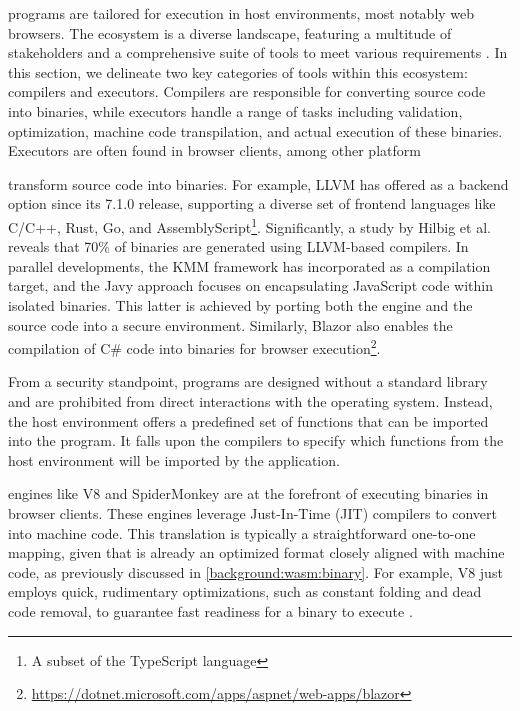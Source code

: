\Wasm programs are tailored for execution in host environments, most notably web browsers. 
The \Wasm ecosystem is a diverse landscape, featuring a multitude of stakeholders and a comprehensive suite of tools to meet various requirements \cite{Avenger}. 
In this section, we delineate two key categories of tools within this ecosystem: compilers and executors. 
Compilers are responsible for converting source code into \Wasm binaries, while executors handle a range of tasks including validation, optimization, machine code transpilation, and actual execution of these \Wasm binaries. 
Executors are often found in browser clients, among other platform

 transform source code into \Wasm binaries. 
For example, LLVM has offered \Wasm as a backend option since its 7.1.0 release, supporting a diverse set of frontend languages like C/C++, Rust, Go, and AssemblyScript\footnote{A subset of the TypeScript language}.
Significantly, a study by Hilbig et al. reveals that 70\% of \Wasm binaries are generated using LLVM-based compilers. 
In parallel developments, the KMM framework has incorporated \Wasm as a compilation target, and the Javy approach focuses on encapsulating JavaScript code within isolated \Wasm binaries. 
This latter is achieved by porting both the engine and the source code into a secure \Wasm environment. 
Similarly, Blazor also enables the compilation of C# code into \Wasm binaries for browser execution\footnote{\url{https://dotnet.microsoft.com/apps/aspnet/web-apps/blazor}}.

From a security standpoint, \Wasm programs are designed without a standard library and are prohibited from direct interactions with the operating system. Instead, the host environment offers a predefined set of functions that can be imported into the \Wasm program. 
It falls upon the compilers to specify which functions from the host environment will be imported by the \Wasm application.

 engines like V8 and SpiderMonkey are at the forefront of executing \Wasm binaries in browser clients. 
These engines leverage Just-In-Time (JIT) compilers to convert \Wasm into machine code. 
This translation is typically a straightforward one-to-one mapping, given that \Wasm is already an optimized format closely aligned with machine code, as previously discussed in \autoref{background:wasm:binary}. 
For example, V8 just employs quick, rudimentary optimizations, such as constant folding and dead code removal, to guarantee fast readiness for a \wasm binary to execute \cite{10.1145/3282510}.

